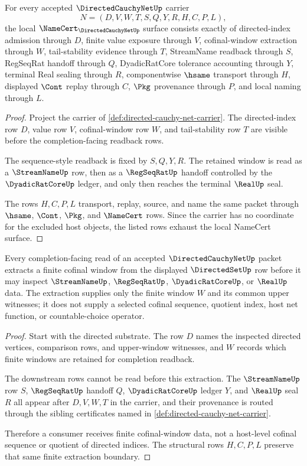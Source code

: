\begin{theorem}
\label{thm:directed-cauchy-net-namecert-obligations}
For every accepted $\DirectedCauchyNetUp$ carrier
$$
N=(D,V,W,T,S,Q,Y,R,H,C,P,L),
$$
the local $\NameCert_{\DirectedCauchyNetUp}$ surface consists exactly of directed-index admission through $D$, finite value exposure through $V$, cofinal-window extraction through $W$, tail-stability evidence through $T$, StreamName readback through $S$, RegSeqRat handoff through $Q$, DyadicRatCore tolerance accounting through $Y$, terminal Real sealing through $R$, componentwise $\hsame$ transport through $H$, displayed $\Cont$ replay through $C$, $\Pkg$ provenance through $P$, and local naming through $L$.
\end{theorem}
\begin{proof}
Project the carrier of \autoref{def:directed-cauchy-net-carrier}. The directed-index row $D$, value row $V$, cofinal-window row $W$, and tail-stability row $T$ are visible before the completion-facing readback rows.

The sequence-style readback is fixed by $S,Q,Y,R$. The retained window is read as a $\StreamNameUp$ row, then as a $\RegSeqRatUp$ handoff controlled by the $\DyadicRatCoreUp$ ledger, and only then reaches the terminal $\RealUp$ seal.

The rows $H,C,P,L$ transport, replay, source, and name the same packet through $\hsame$, $\Cont$, $\Pkg$, and $\NameCert$ rows. Since the carrier has no coordinate for the excluded host objects, the listed rows exhaust the local NameCert surface.
\end{proof}

\begin{theorem}
\label{thm:directed-cauchy-net-finite-window-extraction}
Every completion-facing read of an accepted $\DirectedCauchyNetUp$ packet extracts a finite cofinal window from the displayed $\DirectedSetUp$ row before it may inspect $\StreamNameUp$, $\RegSeqRatUp$, $\DyadicRatCoreUp$, or $\RealUp$ data. The extraction supplies only the finite window $W$ and its common upper witnesses; it does not supply a selected cofinal sequence, quotient index, host net function, or countable-choice operator.
\end{theorem}
\begin{proof}
Start with the directed substrate. The row $D$ names the inspected directed vertices, comparison rows, and upper-window witnesses, and $W$ records which finite windows are retained for completion readback.

The downstream rows cannot be read before this extraction. The $\StreamNameUp$ row $S$, $\RegSeqRatUp$ handoff $Q$, $\DyadicRatCoreUp$ ledger $Y$, and $\RealUp$ seal $R$ all appear after $D,V,W,T$ in the carrier, and their provenance is routed through the sibling certificates named in \autoref{def:directed-cauchy-net-carrier}.

Therefore a consumer receives finite cofinal-window data, not a host-level cofinal sequence or quotient of directed indices. The structural rows $H,C,P,L$ preserve that same finite extraction boundary.
\end{proof}

